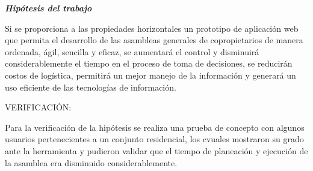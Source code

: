 \textbf{\textit{Hipótesis del trabajo}}

\vspace{0.5cm}

Si se proporciona a las propiedades horizontales un prototipo de aplicación web que permita el desarrollo de las asambleas generales de copropietarios de manera ordenada, ágil, sencilla y eficaz, se aumentará el control y disminuirá considerablemente el tiempo en el proceso de toma de decisiones, se reducirán costos de logística, permitirá un mejor manejo de la información y generará un uso eficiente de las tecnologías de información.

\vspace{1cm}

VERIFICACIÓN:

Para la verificación de la hipótesis se realiza una prueba de concepto con algunos usuarios pertenecientes a un conjunto residencial, los cvuales mostraron su grado ante la herramienta y pudieron validar que el tiempo de planeación y ejecución de la asamblea era disminuido considerablemente.

\newpage